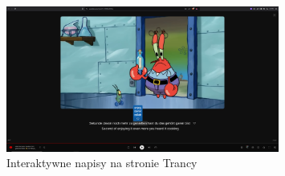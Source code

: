 \begin{figure}[H]
    \centering
    \includegraphics[width=0.8\textwidth]{IMAGE/Trancy.png}
    \caption{Interaktywne napisy na stronie Trancy}
    \label{fig:Trancy}
\end{figure}